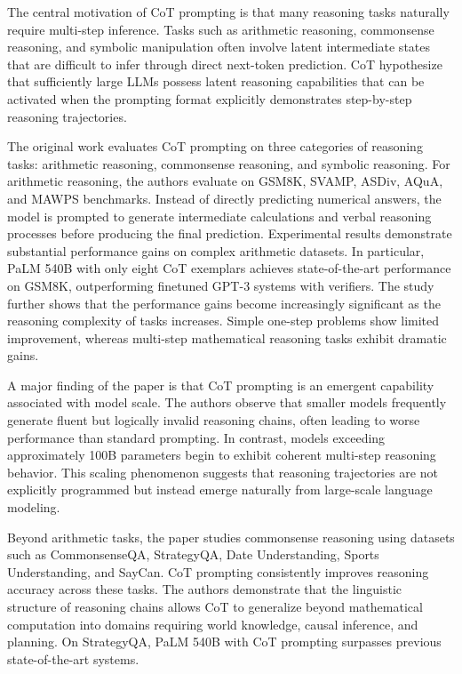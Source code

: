 The central motivation of CoT prompting is that many reasoning tasks naturally require multi-step inference. Tasks such as arithmetic reasoning, commonsense reasoning, and symbolic manipulation often involve latent intermediate states that are difficult to infer through direct next-token prediction. CoT hypothesize that sufficiently large LLMs possess latent reasoning capabilities that can be activated when the prompting format explicitly demonstrates step-by-step reasoning trajectories.

The original work evaluates CoT prompting on three categories of reasoning tasks: arithmetic reasoning, commonsense reasoning, and symbolic reasoning. For arithmetic reasoning, the authors evaluate on GSM8K, SVAMP, ASDiv, AQuA, and MAWPS benchmarks. Instead of directly predicting numerical answers, the model is prompted to generate intermediate calculations and verbal reasoning processes before producing the final prediction. Experimental results demonstrate substantial performance gains on complex arithmetic datasets. In particular, PaLM 540B with only eight CoT exemplars achieves state-of-the-art performance on GSM8K, outperforming finetuned GPT-3 systems with verifiers. The study further shows that the performance gains become increasingly significant as the reasoning complexity of tasks increases. Simple one-step problems show limited improvement, whereas multi-step mathematical reasoning tasks exhibit dramatic gains.

A major finding of the paper is that CoT prompting is an emergent capability associated with model scale. The authors observe that smaller models frequently generate fluent but logically invalid reasoning chains, often leading to worse performance than standard prompting. In contrast, models exceeding approximately 100B parameters begin to exhibit coherent multi-step reasoning behavior. This scaling phenomenon suggests that reasoning trajectories are not explicitly programmed but instead emerge naturally from large-scale language modeling.

Beyond arithmetic tasks, the paper studies commonsense reasoning using datasets such as CommonsenseQA, StrategyQA, Date Understanding, Sports Understanding, and SayCan. CoT prompting consistently improves reasoning accuracy across these tasks. The authors demonstrate that the linguistic structure of reasoning chains allows CoT to generalize beyond mathematical computation into domains requiring world knowledge, causal inference, and planning. On StrategyQA, PaLM 540B with CoT prompting surpasses previous state-of-the-art systems.

